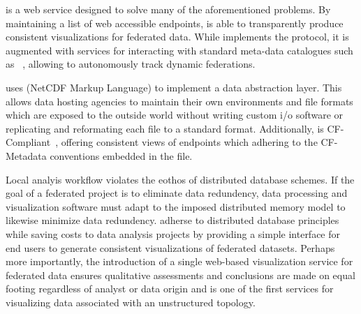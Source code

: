  \sciwms{} is a web service designed to solve many of the
aforementioned problems. By maintaining a list of web accessible
endpoints, \sciwms{} is able to transparently produce consistent
visualizations for federated data. While \sciwms{} implements the
\ogc{} \wms{} protocol, it is augmented with services for interacting
with standard meta-data catalogues such as \csw{}~\cite{csw14},
allowing \sciwms{} to autonomously track dynamic federations.

\sciwms{} uses \ncml{} (NetCDF Markup Language) to implement a data
abstraction layer. This allows data hosting agencies to maintain their
own environments and file formats which are exposed to the outside
world without writing custom i/o software or replicating and reformating each file to
a standard format. Additionally, \sciwms{} is CF-Compliant~\cite{cf},
offering consistent views of endpoints which adhering to the
CF-Metadata conventions embedded in the \ncml{} file.

Local analyis workflow violates the eothos of distributed database
schemes. If the goal of a federated project is to eliminate data
redundency, data processing and visualization software must adapt to
the imposed distributed memory model to likewise minimize data
redundency. \sciwms{} adherse to distributed database principles while
saving costs to data analysis projects by providing a simple interface
for end users to generate consistent visualizations of federated
datasets. Perhaps more importantly, the introduction of a single
web-based visualization service for federated data ensures qualitative
assessments and conclusions are made on equal footing regardless of
analyst or data origin and is one of the first services for
visualizing data associated with an unstructured topology.

